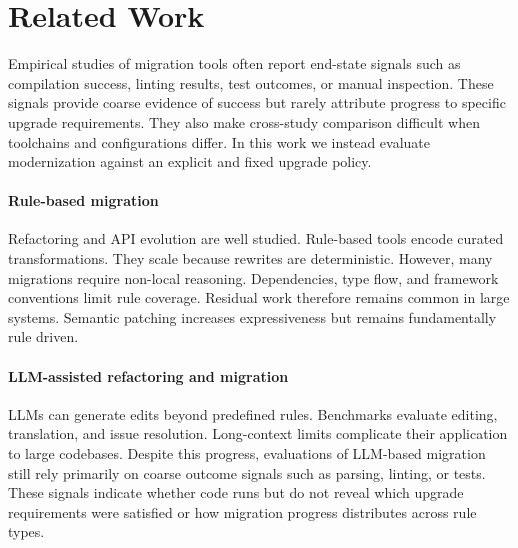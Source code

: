 \section{Related Work}
\label{sec:related}

Empirical studies of migration tools often report end-state signals such as compilation success, linting results, test outcomes, or manual inspection. These signals provide coarse evidence of success but rarely attribute progress to specific upgrade requirements. They also make cross-study comparison difficult when toolchains and configurations differ. In this work we instead evaluate modernization against an explicit and fixed upgrade policy.

\paragraph*{Rule-based migration}
Refactoring and API evolution are well studied.\cite{DBLP:journals/tse/MensT04,DBLP:conf/oopsla/DigJ06,fowler1999refactoring,henkel2005catchup}
Rule-based tools encode curated transformations.\cite{DBLP:conf/icse/Murphy-HillPB09,rector}
They scale because rewrites are deterministic.\cite{openrewrite,errorprone,refaster,facebook_codemod}
However, many migrations require non-local reasoning. Dependencies, type flow, and framework conventions limit rule coverage.\cite{DBLP:conf/icse/Murphy-HillPB09,mccabe1976complexity,chidamber1994metrics}
Residual work therefore remains common in large systems.\cite{wittern2016api}
Semantic patching increases expressiveness but remains fundamentally rule driven.\cite{coccinelle}

\paragraph*{LLM-assisted refactoring and migration}
LLMs can generate edits beyond predefined rules.\cite{chen2021codex,nijkamp2022codegen,li2022alphacode,ouyang2022instructgpt,touvron2023llama}
Benchmarks evaluate editing, translation, and issue resolution.\cite{cassano2024canitedit,jimenez2024swebench,swebench_verified}
Long-context limits complicate their application to large codebases.\cite{liu2024lost,du2025context}
Despite this progress, evaluations of LLM-based migration still rely primarily on coarse outcome signals such as parsing, linting, or tests.\cite{openai2023gpt4,roziere2023codellama}
These signals indicate whether code runs but do not reveal which upgrade requirements were satisfied or how migration progress distributes across rule types.

